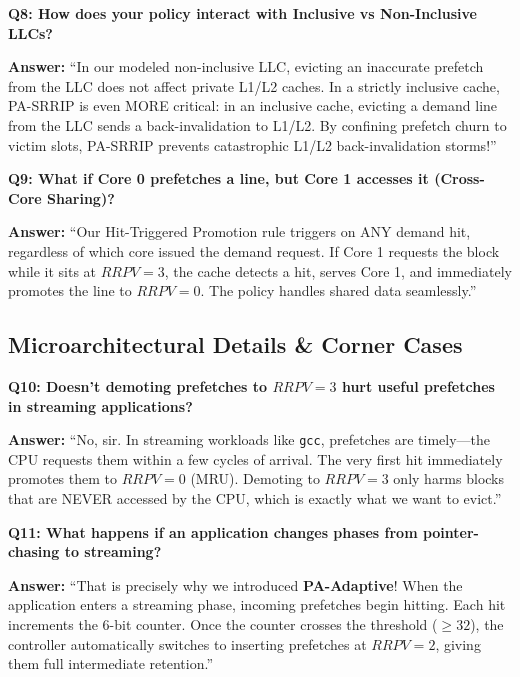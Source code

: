 \documentclass[11pt, a4paper]{article}
\begin{document}
\begin{trapbox}
\textbf{Q8: How does your policy interact with Inclusive vs Non-Inclusive LLCs?}
\end{trapbox}
\begin{answerbox}
\textbf{Answer:} ``In our modeled non-inclusive LLC, evicting an inaccurate prefetch from the LLC does not affect private L1/L2 caches. In a strictly inclusive cache, PA-SRRIP is even MORE critical: in an inclusive cache, evicting a demand line from the LLC sends a back-invalidation to L1/L2. By confining prefetch churn to victim slots, PA-SRRIP prevents catastrophic L1/L2 back-invalidation storms!''
\end{answerbox}

\begin{trapbox}
\textbf{Q9: What if Core 0 prefetches a line, but Core 1 accesses it (Cross-Core Sharing)?}
\end{trapbox}
\begin{answerbox}
\textbf{Answer:} ``Our Hit-Triggered Promotion rule triggers on ANY demand hit, regardless of which core issued the demand request. If Core 1 requests the block while it sits at $RRPV=3$, the cache detects a hit, serves Core 1, and immediately promotes the line to $RRPV=0$. The policy handles shared data seamlessly.''
\end{answerbox}

\subsection{Microarchitectural Details \& Corner Cases}

\begin{trapbox}
\textbf{Q10: Doesn't demoting prefetches to $RRPV=3$ hurt useful prefetches in streaming applications?}
\end{trapbox}
\begin{answerbox}
\textbf{Answer:} ``No, sir. In streaming workloads like \texttt{gcc}, prefetches are timely---the CPU requests them within a few cycles of arrival. The very first hit immediately promotes them to $RRPV=0$ (MRU). Demoting to $RRPV=3$ only harms blocks that are NEVER accessed by the CPU, which is exactly what we want to evict.''
\end{answerbox}

\begin{trapbox}
\textbf{Q11: What happens if an application changes phases from pointer-chasing to streaming?}
\end{trapbox}
\begin{answerbox}
\textbf{Answer:} ``That is precisely why we introduced \textbf{PA-Adaptive}! When the application enters a streaming phase, incoming prefetches begin hitting. Each hit increments the 6-bit counter. Once the counter crosses the threshold ($\ge 32$), the controller automatically switches to inserting prefetches at $RRPV=2$, giving them full intermediate retention.''
\end{answerbox}
\end{document}
